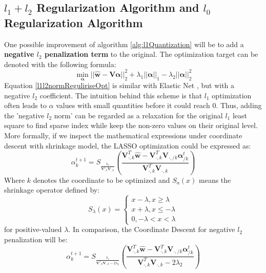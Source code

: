 \documentclass[preprint,10pt]{elsarticle}
\begin{document}
\subsection{$l_1+l_2$ Regularization Algorithm and $l_0$ Regularization Algorithm}
One possible improvement of algorithm \ref{alg:l1Quantization} will be to add a \textbf{negative $l_2$ penalization term} to the original. The optimization target can be denoted with the following formula:
\begin{equation}\label{l1l2normReguliriseOpt}
\min_{\boldsymbol{\alpha}} ||\boldsymbol{\hat{w}} -\boldsymbol{V}\boldsymbol{\alpha}||_{2}^{2} + \lambda_1 ||\boldsymbol{\alpha}||_{1} - \lambda_2 ||\boldsymbol{\alpha}||_{2}^{2}
\end{equation}
Equation \ref{l1l2normReguliriseOpt} is similar with Elastic Net \cite{zou2005ElasticNet}, but with a negative $l_2$ coefficient. The intuition behind this scheme is that $l_1$ optimization often leads to $\alpha$ values with small quantities before it could reach $0$. Thus, adding the 'negative $l_2$ norm' can be regarded as a relaxation for the original $l_1$ least square to find sparse index while keep the non-zero values on their original level. More formally, if we inspect the mathematical expressions under coordinate descent with shrinkage model, the LASSO optimization could be expressed as:\\
\begin{equation}
\label{LassoCoordinateDescent}
\alpha_{k}^{t+1} = S_{\frac{\lambda_{1}}{\boldsymbol{V}_{\cdot,k}^{T}\boldsymbol{V}_{\cdot,k}}}(\frac{\boldsymbol{V}_{\cdot,k}^{T}\boldsymbol{\hat{w}}-\boldsymbol{V}_{\cdot,k}^{T}\boldsymbol{V}_{\cdot,/k}\boldsymbol{\alpha}_{/k}^{t}}{\boldsymbol{V}_{\cdot,k}^{T}\boldsymbol{V}_{\cdot,k}})
\end{equation}
Where $k$ denotes the coordinate to be optimized and $S_{a}(x)$ means the shrinkage operator defined by:\\
\begin{equation*}
S_{\lambda}(x) = 
\begin{cases}
x-\lambda, x\geq \lambda\\
x+\lambda, x\leq -\lambda\\
0, -\lambda < x < \lambda
\end{cases}
\end{equation*}
for positive-valued $\lambda$. In comparison, the Coordinate Descent for negative $l_2$ penalization will be:\\
\begin{equation}
\label{l1l2CoordinateDescent}
\alpha_{k}^{t+1} = S_{\frac{\lambda_{1}}{\boldsymbol{V}_{\cdot,k}^{T}\boldsymbol{V}_{\cdot,k}-2\lambda_2}}(\frac{\boldsymbol{V}_{\cdot,k}^{T}\boldsymbol{\hat{w}}-\boldsymbol{V}_{\cdot,k}^{T}\boldsymbol{V}_{\cdot,/k}\boldsymbol{\alpha}_{/k}^{t}}{\boldsymbol{V}_{\cdot,k}^{T}\boldsymbol{V}_{\cdot,k}-2\lambda_2})
\end{equation}
\end{document}
